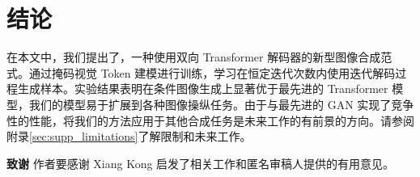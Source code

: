 \section{结论}

在本文中，我们提出了\model ，一种使用双向 Transformer 解码器的新型图像合成范式。通过掩码视觉 Token 建模进行训练，\model 学习在恒定迭代次数内使用迭代解码过程生成样本。实验结果表明\model 在条件图像生成上显著优于最先进的 Transformer 模型，我们的模型易于扩展到各种图像操纵任务。由于\model 与最先进的 GAN 实现了竞争性的性能，将我们的方法应用于其他合成任务是未来工作的有前景的方向。请参阅附录\ref{sec:supp_limitations}了解限制和未来工作。


\noindent \textbf{致谢}
作者要感谢 Xiang Kong 启发了相关工作和匿名审稿人提供的有用意见。